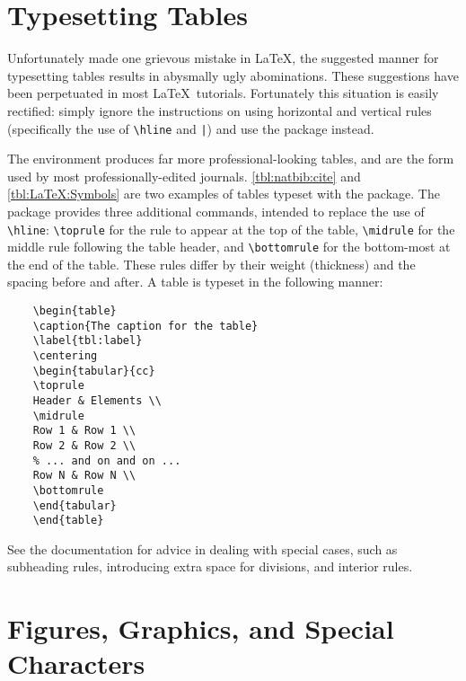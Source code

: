 \section{Typesetting Tables}
\label{sec:TypesettingTables}

Unfortunately \citet{lamport-1994-ladps} made one grievous mistake
in \LaTeX, the suggested manner for typesetting tables results
in abysmally ugly abominations.  These suggestions have been
perpetuated in most \LaTeX\ tutorials.
Fortunately this situation is easily rectified: simply ignore the
instructions on using horizontal and
vertical rules (specifically the use of \verb+\hline+ and \verb+|+) and
use the  package instead.

The  environment produces far more professional-looking
tables, and are the form used by most professionally-edited journals.
\autoref{tbl:natbib:cite} and \autoref{tbl:LaTeX:Symbols} are two
examples of tables typeset with the  package.
The  package provides three additional commands,
intended to replace the use of \verb+\hline+:
\verb+\toprule+ for the rule to appear at the top of the table,
\verb+\midrule+ for the middle rule following the table header,
and \verb+\bottomrule+ for the bottom-most at the end of the table.
These rules differ by their weight (thickness) and the spacing before
and after.
A table is typeset in the following manner:
\begin{lstlisting}
    \begin{table}
    \caption{The caption for the table}
    \label{tbl:label}
    \centering
    \begin{tabular}{cc}
    \toprule
    Header & Elements \\
    \midrule
    Row 1 & Row 1 \\
    Row 2 & Row 2 \\
    % ... and on and on ...
    Row N & Row N \\
    \bottomrule
    \end{tabular}
    \end{table}
\end{lstlisting}
See the  documentation for advice in dealing with
special cases, such as subheading rules, introducing extra space
for divisions, and interior rules.

\section{Figures, Graphics, and Special Characters}
\label{sec:Graphics}

